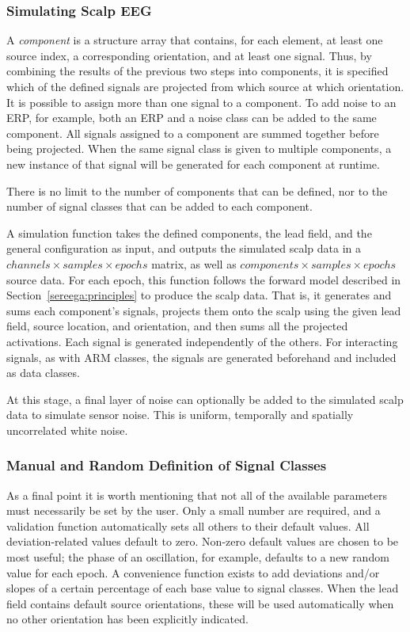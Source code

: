 \subsubsection{Simulating Scalp EEG}

A \emph{component} is a structure array that contains, for each element, at least one source index, a corresponding orientation, and at least one signal. Thus, by combining the results of the previous two steps into components, it is specified which of the defined signals are projected from which source at which orientation. It is possible to assign more than one signal to a component. To add noise to an ERP, for example, both an ERP and a noise class can be added to the same component. All signals assigned to a component are summed together before being projected. When the same signal class is given to multiple components, a new instance of that signal will be generated for each component at runtime.

There is no limit to the number of components that can be defined, nor to the number of signal classes that can be added to each component.

A simulation function takes the defined components, the lead field, and the general configuration as input, and outputs the simulated scalp data in a $channels \times samples \times epochs$ matrix, as well as $components \times samples \times epochs$ source data. For each epoch, this function follows the forward model described in Section~\ref{sereega:principles} to produce the scalp data. That is, it generates and sums each component's signals, projects them onto the scalp using the given lead field, source location, and orientation, and then sums all the projected activations. Each signal is generated independently of the others. For interacting signals, as with ARM classes, the signals are generated beforehand and included as data classes.

At this stage, a final layer of noise can optionally be added to the simulated scalp data to simulate sensor noise. This is uniform, temporally and spatially uncorrelated white noise.


\subsubsection{Manual and Random Definition of Signal Classes}

As a final point it is worth mentioning that not all of the available parameters must necessarily be set by the user. Only a small number are required, and a validation function automatically sets all others to their default values. All deviation-related values default to zero. Non-zero default values are chosen to be most useful; the phase of an oscillation, for example, defaults to a new random value for each epoch. A convenience function exists to add deviations and/or slopes of a certain percentage of each base value to signal classes. When the lead field contains default source orientations, these will be used automatically when no other orientation has been explicitly indicated.

